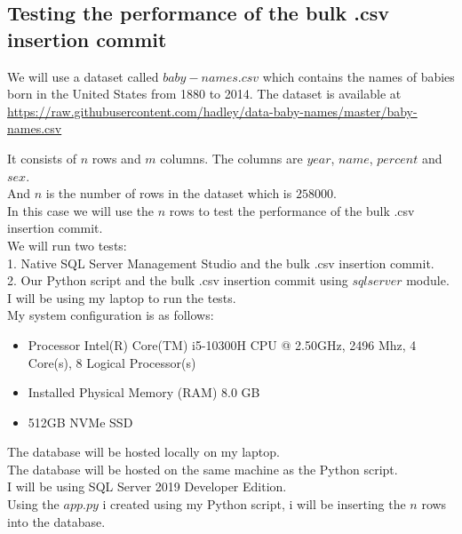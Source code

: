 \subsection{Testing the performance of the bulk .csv insertion commit}

We will use a dataset called $baby-names.csv$ which contains the names of babies born in the United States from 1880 to 2014. The dataset is available at \url{https://raw.githubusercontent.com/hadley/data-baby-names/master/baby-names.csv}

It consists of $n$ rows and $m$ columns. The columns are $year$, $name$, $percent$ and $sex$. \\

And $n$ is the number of rows in the dataset which is $258000$. \\

In this case we will use the $n$ rows to test the performance of the bulk .csv insertion commit. \\

We will run two tests: \\

1. Native SQL Server Management Studio and the bulk .csv insertion commit. \\
2. Our Python script and the bulk .csv insertion commit using $sqlserver$ module. \\

I will be using my laptop to run the tests. \\

My system configuration is as follows: \\
\begin{itemize}
\item Processor	Intel(R) Core(TM) i5-10300H CPU @ 2.50GHz, 2496 Mhz, 4 Core(s), 8 Logical Processor(s)
\item Installed Physical Memory (RAM)	8.0 GB
\item 512GB NVMe SSD
\end{itemize}

The database will be hosted locally on my laptop. \\
The database will be hosted on the same machine as the Python script. \\
I will be using SQL Server 2019 Developer Edition. \\

Using the $app.py$ i created using my Python script, i will be inserting the $n$ rows into the database. \\

